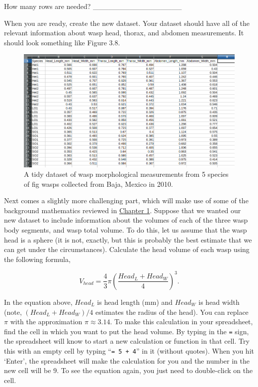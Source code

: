\documentclass[
]{scrbook}
\begin{document}
How many rows are needed? \_\_\_\_\_\_\_\_\_\_\_\_\_\_\_\_\_

When you are ready, create the new dataset.
Your dataset should have all of the relevant information about wasp head, thorax, and abdomen measurements.
It should look something like Figure 3.8.

\begin{figure}
\includegraphics[width=1\linewidth]{img/Ch1_Ex3_tidy} \caption{A tidy dataset of wasp morphological measurements from 5 species of fig wasps collected from Baja, Mexico in 2010.}\label{fig:unnamed-chunk-19}
\end{figure}

Next comes a slightly more challenging part, which will make use of some of the background mathematics reviewed in \protect\hyperlink{Chapter_1}{Chapter 1}.
Suppose that we wanted our new dataset to include information about the volumes of each of the three wasp body segments, and wasp total volume.
To do this, let us assume that the wasp head is a sphere (it is not, exactly, but this is probably the best estimate that we can get under the circumstances).
Calculate the head volume of each wasp using the following formula,

\[V_{head} = \frac{4}{3}\pi \left(\frac{Head_L + Head_W}{4}\right)^{3}.\]

In the equation above, \(Head_{L}\) is head length (mm) and \(Head_{W}\) is head width (note, \((Head_L + Head_W)/4\) estimates the radius of the head).
You can replace \(\pi\) with the approximation \(\pi \approx 3.14\).
To make this calculation in your spreadsheet, find the cell in which you want to put the head volume.
By typing in the \texttt{=} sign, the spreadsheet will know to start a new calculation or function in that cell.
Try this with an empty cell by typing ``\texttt{=\ 5\ +\ 4}'' in it (without quotes).
When you hit `Enter', the spreadsheet will make the calculation for you and the number in the new cell will be 9.
To see the equation again, you just need to double-click on the cell.
\end{document}

